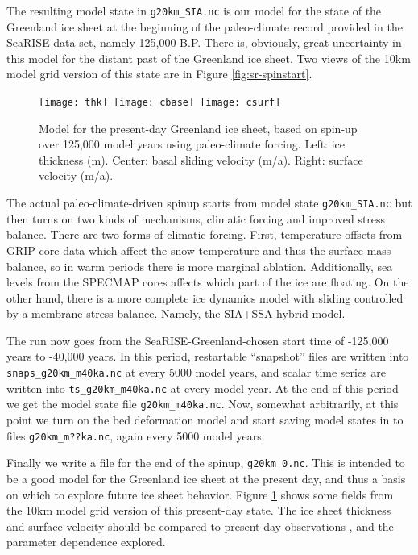 The resulting model state in \texttt{g20km_SIA.nc} is our model for the state of the Greenland ice sheet at the beginning of the paleo-climate record provided in the SeaRISE data set, namely 125,000 B.P.  There is, obviously, great uncertainty in this model for the distant past of the Greenland ice sheet.  Two views of the 10km model grid version of this state are in Figure \ref{fig:sr-spinstart}.

\begin{figure}[ht]
\centering
\mbox{\texttt{[image: thk]}
  \qquad \texttt{[image: cbase]}
  \qquad \texttt{[image: csurf]}}
\caption{Model for the present-day Greenland ice sheet, based on spin-up over 125,000 model years using paleo-climate forcing.  Left: ice thickness (m).  Center: basal sliding velocity (m/a).  Right: surface velocity (m/a).}
\label{fig:sr-spindone-map}
\end{figure}


The actual paleo-climate-driven spinup starts from model state \texttt{g20km_SIA.nc} but then turns on two kinds of mechanisms, climatic forcing and improved stress balance.  There are two forms of climatic forcing. First, temperature offsets from GRIP core data which affect the snow temperature and thus the surface mass balance, so in warm periods there is more marginal ablation.  Additionally, sea levels from the SPECMAP cores affects which part of the ice are floating.  On the other hand, there is a more complete ice dynamics model with sliding controlled by a membrane stress balance.  Namely, the SIA+SSA hybrid model.

The run now goes from the SeaRISE-Greenland-chosen start time of -125,000 years to -40,000 years.  In this period, restartable ``snapshot'' files are written into \texttt{snaps_g20km_m40ka.nc} at every 5000 model years, and scalar time series are written into \texttt{ts_g20km_m40ka.nc} at every model year.  At the end of this period we get the model state file \texttt{g20km_m40ka.nc}.  Now, somewhat arbitrarily, at this point we turn on the bed deformation model and start saving model states in to files \texttt{g20km_m??ka.nc}, again every 5000 model years.

Finally we write a file for the end of the spinup, \texttt{g20km_0.nc}.  This is intended to be a good model for the Greenland ice sheet at the present day, and thus a basis on which to explore future ice sheet behavior.  Figure \ref{fig:sr-spindone-map} shows some fields from the 10km model grid version of this present-day state.  The ice sheet thickness and surface velocity should be compared to present-day observations \cite{BKAJS}, and the parameter dependence explored.

